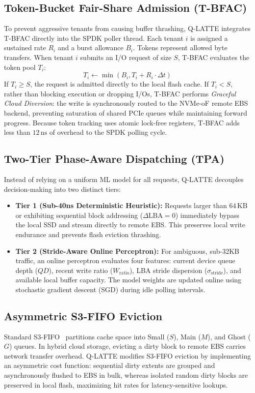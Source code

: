 \documentclass[lettersize,journal]{IEEEtran}
\begin{document}
\subsection{Token-Bucket Fair-Share Admission (T-BFAC)}
To prevent aggressive tenants from causing buffer thrashing, Q-LATTE integrates T-BFAC directly into the SPDK poller thread. Each tenant $i$ is assigned a sustained rate $R_i$ and a burst allowance $B_i$. Tokens represent allowed byte transfers.
When tenant $i$ submits an I/O request of size $S$, T-BFAC evaluates the token pool $T_i$:
\begin{equation}
T_i \leftarrow \min\left(B_i, T_i + R_i \cdot \Delta t\right)
\end{equation}
If $T_i \ge S$, the request is admitted directly to the local flash cache. If $T_i < S$, rather than blocking execution or dropping I/Os, T-BFAC performs \textit{Graceful Cloud Diversion}: the write is synchronously routed to the NVMe-oF remote EBS backend, preventing saturation of shared PCIe queues while maintaining forward progress. Because token tracking uses atomic lock-free registers, T-BFAC adds less than $12\,\text{ns}$ of overhead to the SPDK polling cycle.

\subsection{Two-Tier Phase-Aware Dispatching (TPA)}
Instead of relying on a uniform ML model for all requests, Q-LATTE decouples decision-making into two distinct tiers:
\begin{itemize}
    \item \textbf{Tier 1 (Sub-40ns Deterministic Heuristic):} Requests larger than $64\,\text{KB}$ or exhibiting sequential block addressing ($\Delta \text{LBA} = 0$) immediately bypass the local SSD and stream directly to remote EBS. This preserves local write endurance and prevents flash eviction thrashing.
    \item \textbf{Tier 2 (Stride-Aware Online Perceptron):} For ambiguous, sub-32KB traffic, an online perceptron evaluates four features: current device queue depth ($QD$), recent write ratio ($W_{\text{ratio}}$), LBA stride dispersion ($\sigma_{\text{stride}}$), and available local buffer capacity. The model weights are updated online using stochastic gradient descent (SGD) during idle polling intervals.
\end{itemize}

\subsection{Asymmetric S3-FIFO Eviction}
Standard S3-FIFO~\cite{yang2023fifo} partitions cache space into Small ($S$), Main ($M$), and Ghost ($G$) queues. In hybrid cloud storage, evicting a dirty block to remote EBS carries network transfer overhead. Q-LATTE modifies S3-FIFO eviction by implementing an asymmetric cost function: sequential dirty extents are grouped and asynchronously flushed to EBS in bulk, whereas isolated random dirty blocks are preserved in local flash, maximizing hit rates for latency-sensitive lookups.
\end{document}
